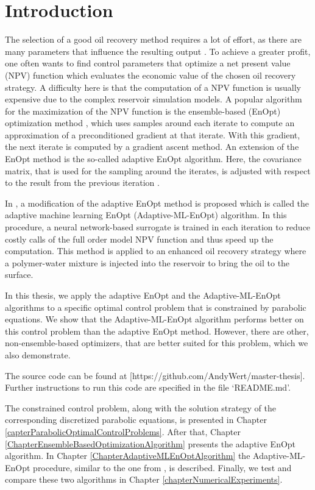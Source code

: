 \chapter{Introduction}

The selection of a good oil recovery method requires a lot of effort, as there are many parameters that influence the resulting output \cite{doi:10.1137/1.9780898717075}. To achieve a greater profit, one often wants to find control parameters that optimize a net present value (NPV) function which evaluates the economic value of the chosen oil recovery strategy. A difficulty here is that the computation of a NPV function is usually expensive due to the complex reservoir simulation models. A popular algorithm for the maximization of the NPV function is the ensemble-based (EnOpt) optimization method \cite{articleChen}, which uses samples around each iterate to compute an approximation of a preconditioned gradient at that iterate. With this gradient, the next iterate is computed by a gradient ascent method. An extension of the EnOpt method is the so-called adaptive EnOpt algorithm. Here, the covariance matrix, that is used for the sampling around the iterates, is adjusted with respect to the result from the previous iteration \cite{Stordal2016-cj}.

In \cite{Keil2022-dj}, a modification of the adaptive EnOpt method is proposed which is called the adaptive machine learning EnOpt (Adaptive-ML-EnOpt) algorithm. In this procedure, a neural network-based surrogate is trained in each iteration to reduce costly calls of the full order model NPV function and thus speed up the computation. This method is applied to an enhanced oil recovery strategy \cite{ABIDIN201211} where a polymer-water mixture is injected into the reservoir to bring the oil to the surface.

In this thesis, we apply the adaptive EnOpt and the Adaptive-ML-EnOpt algorithms to a specific optimal control problem that is constrained by parabolic equations. We show that the Adaptive-ML-EnOpt algorithm performs better on this control problem than the adaptive EnOpt method. However, there are other, non-ensemble-based optimizers, that are better suited for this problem, which we also demonstrate.

The source code can be found at [https://github.com/AndyWert/master-thesis]. Further instructions to run this code are specified in the file `README.md'.

The constrained control problem, along with the solution strategy of the corresponding discretized parabolic equations, is presented in Chapter \ref{capterParabolicOptimalControlProblems}. After that, Chapter \ref{ChapterEnsembleBasedOptimizationAlgorithm} presents the adaptive EnOpt algorithm. In Chapter \ref{ChapterAdaptiveMLEnOptAlgorithm} the Adaptive-ML-EnOpt procedure, similar to the one from \cite{Keil2022-dj}, is described. Finally, we test and compare these two algorithms in Chapter \ref{chapterNumericalExperiments}.